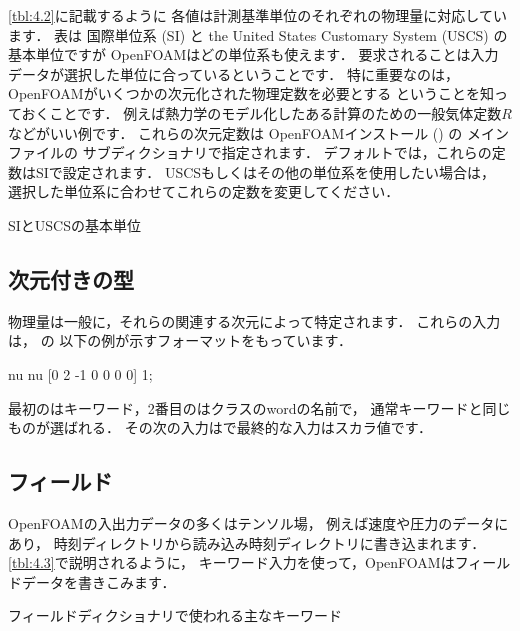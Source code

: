 \autoref{tbl:4.2}に記載するように
各値は計測基準単位のそれぞれの物理量に対応しています．
表は
%
%
国際単位系 (SI) と
%
%
%
the United States Customary System (USCS) の
%
基本単位ですが
OpenFOAMはどの単位系も使えます．
要求されることは入力データが選択した単位に合っているということです．
特に重要なのは，OpenFOAMがいくつかの次元化された物理定数を必要とする
ということを知っておくことです．
例えば熱力学のモデル化したある計算のための一般気体定数$R$などがいい例です．
これらの次元定数は
OpenFOAMインストール () の
メインファイルの
サブディクショナリで指定されます．
デフォルトでは，これらの定数はSIで設定されます．
USCSもしくはその他の単位系を使用したい場合は，
選択した単位系に合わせてこれらの定数を変更してください．


\begin{table}[t]
 
 \caption{SIとUSCSの基本単位}
 \label{tbl:4.2}
\end{table}


\subsection{次元付きの型}
\label{ssec:4.2.7}
物理量は一般に，それらの関連する次元によって特定されます．
これらの入力は，\break
{}の
以下の例が示すフォーマットをもっています．
\begin{OFverbatim}[file]
nu             nu  [0 2 -1 0 0 0 0]  1;
\end{OFverbatim}
最初のはキーワード，2番目のはクラスのwordの名前で，
通常キーワードと同じものが選ばれる．
その次の入力はで最終的な入力はスカラ値です．


\subsection{フィールド}
\label{ssec:4.2.8}
OpenFOAMの入出力データの多くはテンソル場，
例えば速度や圧力のデータにあり，
時刻ディレクトリから読み込み時刻ディレクトリに書き込まれます．
\autoref{tbl:4.3}で説明されるように，
キーワード入力を使って，OpenFOAMはフィールドデータを書きこみます．


\begin{table}[ht]
 
 \caption{フィールドディクショナリで使われる主なキーワード}
 \label{tbl:4.3}
\end{table}


